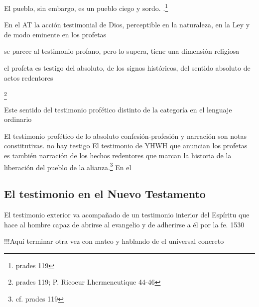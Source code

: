 El pueblo, sin embargo, es un pueblo ciego y sordo. .\footnote{prades 119}

En el AT la acción testimonial de Dios, perceptible en la naturaleza, en la Ley
y de modo eminente en los profetas

se parece al testimonio profano, pero lo supera, tiene una dimensión religiosa

el profeta es testigo del absoluto, de los signos históricos, del sentido
absoluto de actos redentores


\footnote{prades 119; P. Ricoeur Lhermeneutique 44-46}

Este sentido del testimonio profético distinto de la categoría en el lenguaje
ordinario

El testimonio profético de lo absoluto confesión-profesión y narración son notas
constitutivas.
no hay testigo
El testimonio de YHWH que anuncian los profetas es también narración de los
hechos redentores que marcan la historia de la liberación del pueblo de la
alianza.\footnote{cf. prades 119} En el

\subsection{El testimonio en el Nuevo Testamento}
  El testimonio exterior va acompañado de un testimonio interior del Espíritu que
  hace al hombre capaz de abrirse al evangelio y de adherirse a él por la fe. 1530


!!!Aquí terminar otra vez con mateo y hablando de el universal concreto
